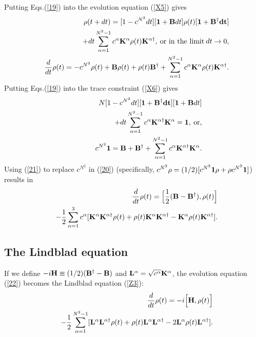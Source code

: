 \documentclass[aps,pra,amssymb, amsfonts,amsmath,showpacs, superscriptaddress,12pt]{revtex4}
\begin{document}
  Putting Eqs.(\ref{19}) into the evolution equation (\ref{X5}) gives
 \begin{eqnarray}\label{20}
 &&{\bf \rho}(t+dt)=[1-c^{N^{2}}dt][{\bf 1}+{\bf B}dt]{\bf\rho}(t)[{\bf 1}+{\bf B^{\dagger}dt}]\nonumber\\
  &&+ dt\sum_{\alpha=1}^{N^{2}-1}c^{\alpha}{\bf K}^{\alpha}{\bf\rho}(t){\bf K}^{\alpha\dagger}, \medspace\hbox {or in the limit}\medspace dt\rightarrow 0,\nonumber \\
  &&\frac{d}{dt}{\bf\rho}(t)=-c^{N^{2}}{\bf\rho}(t)+{\bf B}{\bf\rho}(t)+{\bf\rho}(t){\bf B^{\dagger}}+\sum_{\alpha=1}^{N^{2}-1}c^{\alpha}{\bf K}^{\alpha}{\bf\rho}(t){\bf K}^{\alpha\dagger}.\nonumber \\ 
 \end{eqnarray}
   Putting  Eqs.(\ref{19}) into the trace constraint (\ref{X6}) gives
   \begin{eqnarray}\label{21}
 &&N[1-c^{N^{2}}dt][{\bf 1}+{\bf B^{\dagger}dt][{\bf 1}+{\bf B}}dt]\nonumber\\
&&\qquad\qquad\qquad+dt\sum_{\alpha=1}^{N^{2}-1}c^{\alpha}{\bf K}^{\alpha\dagger}{\bf K}^{\alpha}={\bf 1},\medspace\hbox{or,}\nonumber\\
&&c^{N^{2}}{\bf 1}= {\bf B}+{\bf B}^{\dagger}+\sum_{\alpha=1}^{N^{2}-1}c^{\alpha}{\bf K}^{\alpha\dagger}{\bf K}^{\alpha}.
\end{eqnarray}
\noindent Using (\ref{21}) to replace $c^{N^{2}}$ in (\ref{20}) (specifically, $c^{N^{2}}\rho=(1/2)[c^{N^{2}}{\bf 1}{\bf\rho}+{\bf\rho}c^{N^{2}}{\bf 1}]$) results in 
 \begin{eqnarray}\label{22}
&&\frac{d}{dt}{\bf\rho}(t)=\Big[\frac{1}{2}({\bf B}-{\bf B}^{\dagger}), {\bf\rho}(t)\Big]\nonumber\\
&&-\frac{1}{2}\sum_{\alpha=1}^{3}c^{\alpha}[{\bf K}^{\alpha}{\bf K}^{\alpha\dagger} {\bf\rho}(t)+ {\bf\rho}(t){\bf K}^{\alpha}{\bf K}^{\alpha\dagger}-{\bf K}^{\alpha}{\bf\rho}(t){\bf K}^{\alpha\dagger}].\nonumber\\
 \end{eqnarray}
 
 \subsection{The Lindblad equation}
 
If we define $-i{\bf H}\equiv (1/2)({\bf B^{\dagger}}-{\bf B})$ and 
${\bf L}^{\alpha}=\sqrt{c^{\alpha}}\bf K^{\alpha}$,  the evolution equation (\ref{22}) becomes  the Lindblad equation (\ref{Z3}):
\begin{eqnarray}\label{23}
&&\frac{d}{dt}{\bf\rho}(t)=-i\Big[{\bf H}, {\bf\rho}(t)\Big]\nonumber\\
&&-\frac{1}{2}\sum_{\alpha=1}^{N^{2}-1}[{\bf L}^{\alpha}{\bf L}^{\alpha\dagger} {\bf\rho}(t)+ {\bf\rho}(t){\bf L}^{\alpha}{\bf L}^{\alpha\dagger}-2{\bf L}^{\alpha}{\bf\rho}(t){\bf L}^{\alpha\dagger}].\nonumber\\
 \end{eqnarray}
\end{document}
